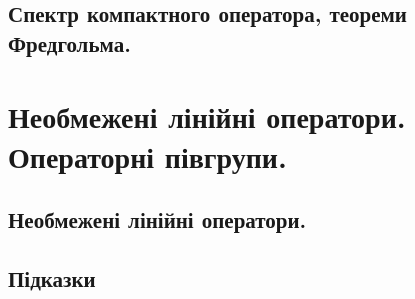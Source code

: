 \documentclass{extreport}
\begin{document}
        \section{Спектр компактного оператора, теореми Фредгольма.}
            
            
            

    \chapter{Необмежені лінійні оператори. Операторні півгрупи.}
        \section{Необмежені лінійні оператори.}
        \newpage
        \section*{Підказки}
            
\end{document}
